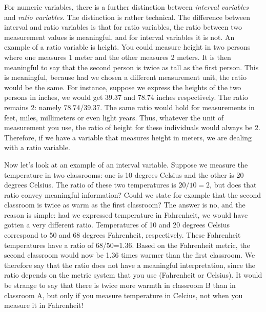 For numeric variables, there is a further distinction between \textit{interval variables} and \textit{ratio variables}. The distinction is rather technical. The difference between interval and ratio variables is that for ratio variables, the ratio between two measurement values is meaningful, and for interval variables it is not. An example of a ratio variable is height. You could measure height in two persons where one measures 1 meter and the other measures 2 meters. It is then meaningful to say that the second person is twice as tall as the first person. This is meaningful, because had we chosen a different measurement unit, the ratio would be the same. For instance, suppose we express the heights of the two persons in inches, we would get 39.37 and 78.74 inches respectively. The ratio remains 2: namely 78.74/39.37. The same ratio would hold for measurements in feet, miles, millimeters or even light years. Thus, whatever the unit of measurement you use, the ratio of height for these individuals would always be 2. Therefore, if we have a variable that measures height in meters, we are dealing with a ratio variable. 




% 



Now let's look at an example of an interval variable. Suppose we measure the temperature in two classrooms: one is 10 degrees Celsius and the other is 20 degrees Celsius. The ratio of these two temperatures is $20/10=2$, but does that ratio convey meaningful information? Could we state for example that the second classroom is twice as warm as the first classroom? The answer is no, and the reason is simple: had we expressed temperature in Fahrenheit, we would have gotten a very different ratio. Temperatures of 10 and 20 degrees Celsius correspond to 50 and 68 degrees Fahrenheit, respectively. These Fahrenheit temperatures have a ratio of 68/50=1.36. Based on the Fahrenheit metric, the second classroom would now be 1.36 times warmer than the first classroom. We therefore say that the ratio does not have a meaningful interpretation, since the ratio depends on the metric system that you use (Fahrenheit or Celsius). It would be strange to say that there is twice more warmth in classroom B than in classroom A, but only if you measure temperature in Celcius, not when you measure it in Fahrenheit!

